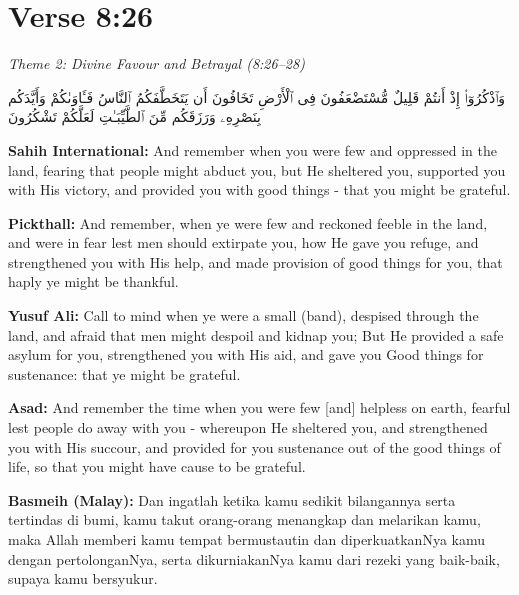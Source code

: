 \documentclass[11pt,a4paper,openany]{book}
\let\textAR\textarabic
\newcommand{\quranverse}[1]{{\centering\Large\textAR{#1}\par}}
\begin{document}
\newpage

\section{Verse 8:26}
{\small\color{accent2}\itshape Theme 2: Divine Favour and Betrayal (8:26--28)}


\begin{quranbox}[Qur'an 8:26]
\quranverse{وَٱذْكُرُوٓا۟ إِذْ أَنتُمْ قَلِيلٌ مُّسْتَضْعَفُونَ فِى ٱلْأَرْضِ تَخَافُونَ أَن يَتَخَطَّفَكُمُ ٱلنَّاسُ فَـَٔاوَىٰكُمْ وَأَيَّدَكُم بِنَصْرِهِۦ وَرَزَقَكُم مِّنَ ٱلطَّيِّبَـٰتِ لَعَلَّكُمْ تَشْكُرُونَ}

\vspace{6pt}
\noindent\textbf{Sahih International:} And remember when you were few and oppressed in the land, fearing that people might abduct you, but He sheltered you, supported you with His victory, and provided you with good things - that you might be grateful.

\vspace{4pt}
\noindent\textbf{Pickthall:} And remember, when ye were few and reckoned feeble in the land, and were in fear lest men should extirpate you, how He gave you refuge, and strengthened you with His help, and made provision of good things for you, that haply ye might be thankful.

\vspace{4pt}
\noindent\textbf{Yusuf Ali:} Call to mind when ye were a small (band), despised through the land, and afraid that men might despoil and kidnap you; But He provided a safe asylum for you, strengthened you with His aid, and gave you Good things for sustenance: that ye might be grateful.

\vspace{4pt}
\noindent\textbf{Asad:} And remember the time when you were few [and] helpless on earth, fearful lest people do away with you - whereupon He sheltered you, and strengthened you with His succour, and provided for you sustenance out of the good things of life, so that you might have cause to be grateful.

\vspace{4pt}
\noindent\textbf{Basmeih (Malay):} Dan ingatlah ketika kamu sedikit bilangannya serta tertindas di bumi, kamu takut orang-orang menangkap dan melarikan kamu, maka Allah memberi kamu tempat bermustautin dan diperkuatkanNya kamu dengan pertolonganNya, serta dikurniakanNya kamu dari rezeki yang baik-baik, supaya kamu bersyukur.
\end{quranbox}
\end{document}
